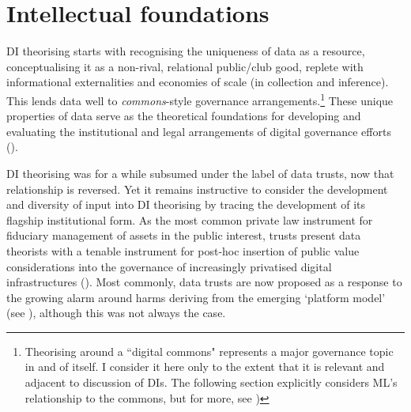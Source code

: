 \section*{Intellectual foundations}

DI theorising starts with recognising the uniqueness of data as a resource, conceptualising it as a non-rival, relational public/club good, replete with informational externalities and economies of scale (in collection and inference). This lends data well to \textit{commons}-style governance arrangements.\footnote{Theorising around a ``digital commons" represents a major governance topic in and of itself. I consider it here only to the extent that it is relevant and adjacent to discussion of DIs. The following section explicitly considers ML's relationship to the commons, but for more, see \textcite{dulongderosnay2020DigitalCommons, huang2023GenerativeAIDigital, ostromGoverningCommonsEvolution, dietz2003StruggleGovernCommonsa, grossman2016CaseDataCommons, baarbe2019ProposedAgriculturalData, ottolia2022TopographyDataCommons, spiekermann2021BigDataJustice, meadwayCREATINGDIGITALCOMMONS, dulongderosnay2020DigitalCommons, potts2023ProfitingDataCommons, yakowitzTRAGEDYDATACOMMONS})} These unique properties of data serve as the theoretical foundations for developing and evaluating the institutional and legal arrangements of digital governance efforts (\cite{mills2019WhoOwnsFuture}). 

DI theorising was for a while subsumed under the label of data trusts, now that relationship is reversed. Yet it remains instructive to consider the development and diversity of input into DI theorising by tracing the development of its flagship institutional form. As the most common private law instrument for fiduciary management of assets in the public interest, trusts present data theorists with a tenable instrument for post-hoc insertion of public value considerations into the governance of increasingly privatised digital infrastructures (\cite{mcdonaldReclaimingDataTrusts}). Most commonly, data trusts are now proposed as a response to the growing alarm around harms deriving from the emerging `platform model' (see \textcite{birkinbine2018CommonsPraxisCritical, meadwayCREATINGDIGITALCOMMONS, coyle2021PotentialSocialValuea}), although this was not always the case.


